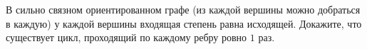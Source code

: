 В сильно связном ориентированном графе (из каждой вершины можно добраться в каждую) у каждой вершины входящая степень равна
исходящей. Докажите, что существует цикл, проходящий по каждому ребру ровно $1$ раз.